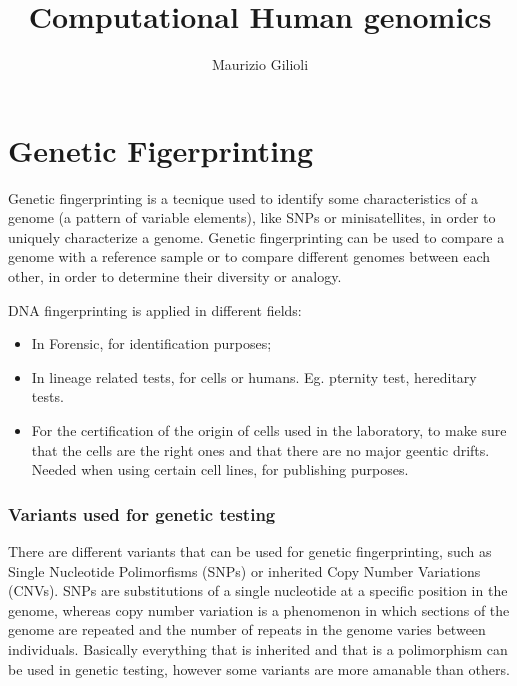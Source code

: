 

\title{\Huge\textbf{Computational Human genomics}}

\author{
  Maurizio Gilioli \\
}


\maketitle
\tableofcontents

% 

\chapter*{Genetic Figerprinting}

Genetic fingerprinting is a tecnique used to identify some characteristics of a genome (a pattern of variable elements), like SNPs or minisatellites, in order to uniquely characterize a genome. Genetic fingerprinting can be used to compare a genome with a reference sample or to compare different genomes between each other, in order to determine their diversity or analogy. 

DNA fingerprinting is applied in different fields:

\begin{itemize}
	\item In Forensic, for identification purposes;
	\item In lineage related tests, for cells or humans. Eg. pternity test, hereditary tests.
	\item For the certification of the origin of cells used in the laboratory, to make sure that the cells are the right ones and that there are no major geentic drifts. Needed when using certain cell lines, for publishing purposes.
\end{itemize}


\subsection*{Variants used for genetic testing}

There are different variants that can be used for genetic fingerprinting, such as Single Nucleotide Polimorfisms (SNPs) or inherited Copy Number Variations (CNVs).
SNPs are substitutions of a single nucleotide at a specific position in the genome, whereas copy number variation is a phenomenon in which sections of the genome are repeated and the number of repeats in the genome varies between individuals.
Basically everything that is inherited and that is a polimorphism can be used in genetic testing, however some variants are more amanable than others.

